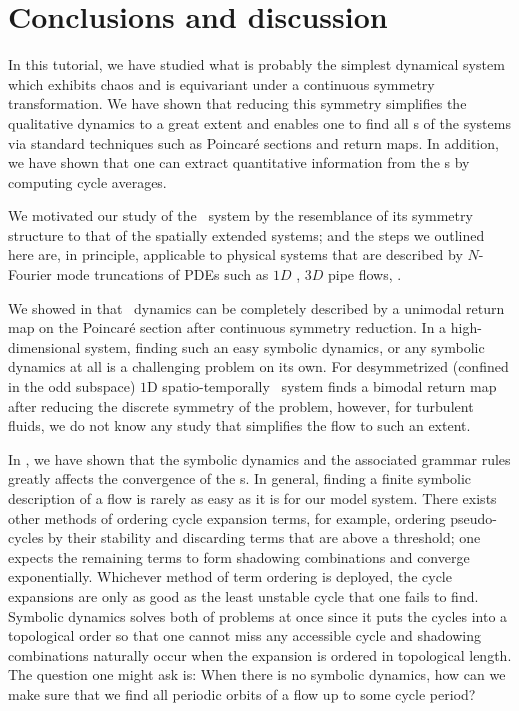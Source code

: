 \section{Conclusions and discussion}
\label{s:concl}

In this tutorial, we have studied what is probably the simplest dynamical system which
exhibits chaos and is equivariant under a continuous symmetry transformation.
We have shown that reducing this symmetry simplifies the qualitative dynamics
to a great extent and enables one to find all \rpo s of the systems via
standard techniques such as Poincar\'e sections and return maps. In
addition, we have shown that one can extract quantitative information
from the \rpo s by computing cycle averages.

We motivated our study of the \twomode\ system by the resemblance of its
symmetry structure to that of the spatially extended systems; and the
steps we outlined here are, in principle, applicable to physical systems
that are described by $N$-Fourier mode truncations of PDEs such as $1D$
\KS{}, $3D$ pipe flows, \etc.

We showed in  that \twomode\ dynamics can be completely
described by a unimodal return map on the Poincar\'e section after continuous 
symmetry reduction. In a high-dimensional system, finding such an easy symbolic 
dynamics, or any symbolic dynamics at all is a challenging problem on its own. 
For desymmetrized (confined in the odd subspace) $1$D spatio-temporally \KS\ 
system  finds a bimodal return map after reducing the discrete 
symmetry of the problem, however, for turbulent fluids, we do not know any study 
that simplifies the flow to such an extent.

In , we have shown that the symbolic dynamics and the
associated grammar rules greatly affects the convergence of the \cycForm s.
In general, finding a finite symbolic description of a flow is rarely as easy as 
it is for our model system. There exists other methods of ordering cycle expansion 
terms, for example, ordering pseudo-cycles by their stability and discarding terms
that are above a threshold; one expects the remaining terms to form shadowing 
combinations and converge exponentially. Whichever method of term ordering is 
deployed, the cycle expansions are only as good as the least unstable cycle that 
one fails to find. Symbolic dynamics solves both of problems at once since it puts 
the cycles into a topological order so that one cannot miss any accessible cycle 
and shadowing combinations naturally occur when the expansion is ordered in 
topological length. The question one might ask is: When there is no symbolic dynamics, 
how can we make sure that we find all periodic orbits of a flow up to some cycle 
period?

